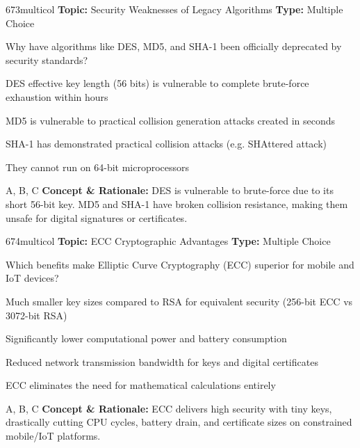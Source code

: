 \begin{qcard}{673}{multicol}
\textcolor{darkslate!75}{\small\textbf{Topic:} Security Weaknesses of Legacy Algorithms \hfill \textbf{Type:} Multiple Choice}\vspace{0.4em}\par
Why have algorithms like DES, MD5, and SHA-1 been officially deprecated by security standards?
\begin{qoptions}
\item DES effective key length (56 bits) is vulnerable to complete brute-force exhaustion within hours
\item MD5 is vulnerable to practical collision generation attacks created in seconds
\item SHA-1 has demonstrated practical collision attacks (e.g. SHAttered attack)
\item They cannot run on 64-bit microprocessors
\end{qoptions}
\end{qcard}
\nopagebreak
\begin{explainbox}{A, B, C}
\textbf{Concept \& Rationale:} DES is vulnerable to brute-force due to its short 56-bit key. MD5 and SHA-1 have broken collision resistance, making them unsafe for digital signatures or certificates.
\end{explainbox}

\begin{qcard}{674}{multicol}
\textcolor{darkslate!75}{\small\textbf{Topic:} ECC Cryptographic Advantages \hfill \textbf{Type:} Multiple Choice}\vspace{0.4em}\par
Which benefits make Elliptic Curve Cryptography (ECC) superior for mobile and IoT devices?
\begin{qoptions}
\item Much smaller key sizes compared to RSA for equivalent security (256-bit ECC vs 3072-bit RSA)
\item Significantly lower computational power and battery consumption
\item Reduced network transmission bandwidth for keys and digital certificates
\item ECC eliminates the need for mathematical calculations entirely
\end{qoptions}
\end{qcard}
\nopagebreak
\begin{explainbox}{A, B, C}
\textbf{Concept \& Rationale:} ECC delivers high security with tiny keys, drastically cutting CPU cycles, battery drain, and certificate sizes on constrained mobile/IoT platforms.
\end{explainbox}

